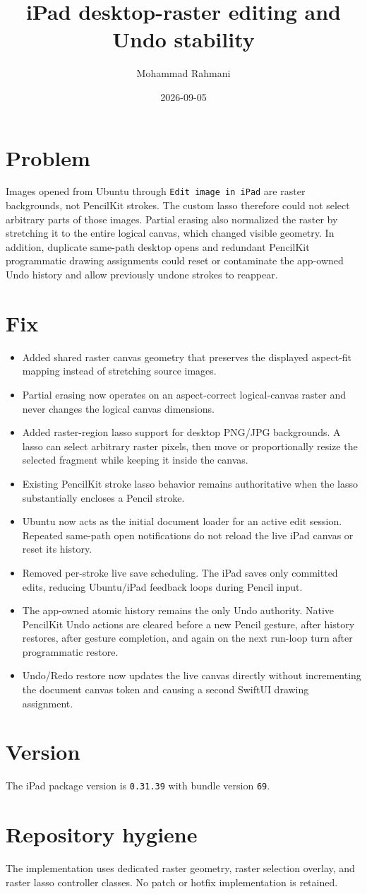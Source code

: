 \documentclass[a4paper]{article}
\title{iPad desktop-raster editing and Undo stability}
\date{2026-09-05}
\author{Mohammad Rahmani}
\begin{document}
\maketitle

\section{Problem}
Images opened from Ubuntu through \texttt{Edit image in iPad} are raster backgrounds,
not PencilKit strokes. The custom lasso therefore could not select arbitrary parts
of those images. Partial erasing also normalized the raster by stretching it to the
entire logical canvas, which changed visible geometry. In addition, duplicate
same-path desktop opens and redundant PencilKit programmatic drawing assignments
could reset or contaminate the app-owned Undo history and allow previously undone
strokes to reappear.

\section{Fix}
\begin{itemize}
   \item Added shared raster canvas geometry that preserves the displayed aspect-fit mapping instead of stretching source images.
   \item Partial erasing now operates on an aspect-correct logical-canvas raster and never changes the logical canvas dimensions.
   \item Added raster-region lasso support for desktop PNG/JPG backgrounds. A lasso can select arbitrary raster pixels, then move or proportionally resize the selected fragment while keeping it inside the canvas.
   \item Existing PencilKit stroke lasso behavior remains authoritative when the lasso substantially encloses a Pencil stroke.
   \item Ubuntu now acts as the initial document loader for an active edit session. Repeated same-path open notifications do not reload the live iPad canvas or reset its history.
   \item Removed per-stroke live save scheduling. The iPad saves only committed edits, reducing Ubuntu/iPad feedback loops during Pencil input.
   \item The app-owned atomic history remains the only Undo authority. Native PencilKit Undo actions are cleared before a new Pencil gesture, after history restores, after gesture completion, and again on the next run-loop turn after programmatic restore.
   \item Undo/Redo restore now updates the live canvas directly without incrementing the document canvas token and causing a second SwiftUI drawing assignment.
\end{itemize}

\section{Version}
The iPad package version is \texttt{0.31.39} with bundle version \texttt{69}.

\section{Repository hygiene}
The implementation uses dedicated raster geometry, raster selection overlay, and
raster lasso controller classes. No patch or hotfix implementation is retained.
\end{document}
